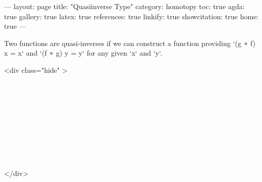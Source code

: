 ---
layout: page
title: "Quasiinverse Type"
category: homotopy
toc: true
agda: true
gallery: true
latex: true
references: true
linkify: true
showcitation: true
home: true
---

Two functions are quasi-inverses if we can construct a function providing
`(g ∘ f) x = x` and `(f ∘ g) y = y` for any given `x` and `y`.

<div class="hide" >
\begin{code}%
\>[0]\AgdaSymbol{\{-\#}\AgdaSpace{}%
\AgdaSpace{}%
\AgdaSpace{}%
\AgdaSymbol{\#-\}}\<%
\\
\>[0]\AgdaSpace{}%
\AgdaSpace{}%
\<%
\\
\>[0]\AgdaSpace{}%
\AgdaSpace{}%
\<%
\\
%
\\[\AgdaEmptyExtraSkip]%
\>[0]\AgdaSpace{}%
\AgdaSpace{}%
\<%
\\
\>[0]\AgdaSpace{}%
\AgdaSpace{}%
\<%
\\
%
\\[\AgdaEmptyExtraSkip]%
\>[0]\AgdaSpace{}%
\AgdaSpace{}%
\<%
\\
\>[0]\AgdaSpace{}%
\AgdaSpace{}%
\<%
\end{code}
</div>

